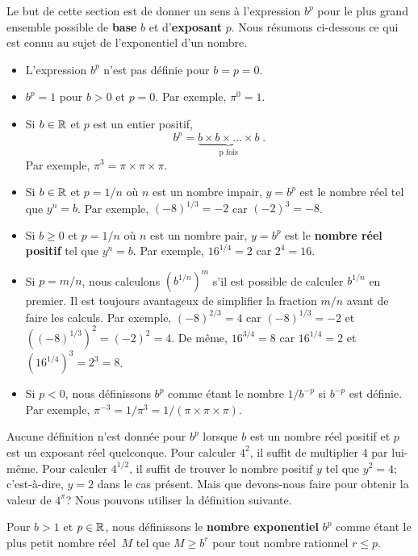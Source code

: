 {Le but de cette section est de donner un sens à l'expression $b^p$
pour le plus grand ensemble possible de {\bfseries base} $b$ et
d'{\bfseries exposant} $p$.  Nous résumons ci-dessous ce qui est connu
au sujet de l'exponentiel d'un nombre.

{\renewcommand{\labelitemi}{\textbullet}
\begin{itemize}
\item L'expression $b^p$ n'est pas définie pour $b=p=0$.
\item $b^p =1$ pour $b>0$ et $p=0$.  Par exemple, $\pi^0 = 1$.
\item Si $b \in \mathbb{R}$ et $p$ est un entier positif,
\[
b^{p} = \underbrace{b \times b \times \ldots \times b}_{\text{p fois}}
\; .
\]
Par exemple, $\pi^3 = \pi \times \pi \times \pi$.
\item Si $b \in \mathbb{R}$ et $p = 1/n$ où $n$ est un nombre impair, $y=b^p$
  est le nombre réel tel que $y^n = b$.  Par exemple,
  $(-8)^{1/3} = -2$ car $(-2)^3 = -8$.
\item Si $b \geq 0$ et $p = 1/n$ où $n$ est un nombre pair, $y=b^p$
  est le {\bfseries nombre réel positif} tel que $y^n = b$.  Par exemple,
  $16^{1/4} = 2$ car $2^4 = 16$.
\item Si $p = m/n$, nous calculons $\displaystyle \left(b^{1/n}\right)^m$
  s'il est possible de calculer $\displaystyle b^{1/n}$ en premier.
  Il est toujours avantageux de simplifier la fraction $m/n$ avant de
  faire les calculs.  Par exemple, $(-8)^{2/3} = 4$ car $(-8)^{1/3} = -2$ et
  $\displaystyle \left((-8)^{1/3}\right)^2 = (-2)^2 = 4$.  De même,
  $16^{3/4} = 8$ car $16^{1/4} =2$ et
  $\displaystyle \left(16^{1/4}\right)^3 = 2^3 = 8$.
\item Si $p<0$, nous définissons $b^p$ comme étant le nombre
  $1/b^{-p}$ si $b^{-p}$ est définie.  Par exemple,
  $\pi^{-3} = 1/\pi^3 = 1/(\pi \times \pi \times \pi)$.
\end{itemize}
}

Aucune définition n'est donnée pour $b^p$ lorsque $b$ est un nombre
réel positif et $p$ est un exposant réel quelconque.  Pour calculer
$4^2$, il suffit de multiplier $4$ par lui-même.  Pour calculer
$4^{1/2}$, il suffit de trouver le nombre positif $y$ tel que $y^2=4$;
c'est-à-dire, $y=2$ dans le cas présent.  Mais que devons-nous faire
pour obtenir la valeur de $4^\pi$?  Nous pouvons utiliser
la définition suivante.

\begin{focus}{\dfn} \label{pr_def_of_exp}
Pour $b >1$ et $p \in \mathbb{R}$, nous définissons le {\bfseries nombre exponentiel}
$b^p$ comme étant le plus petit nombre réel\footnotemark\ $M$ tel que
$M \geq  b^r$ pour tout nombre rationnel $r\leq p$.


\end{focus}}
